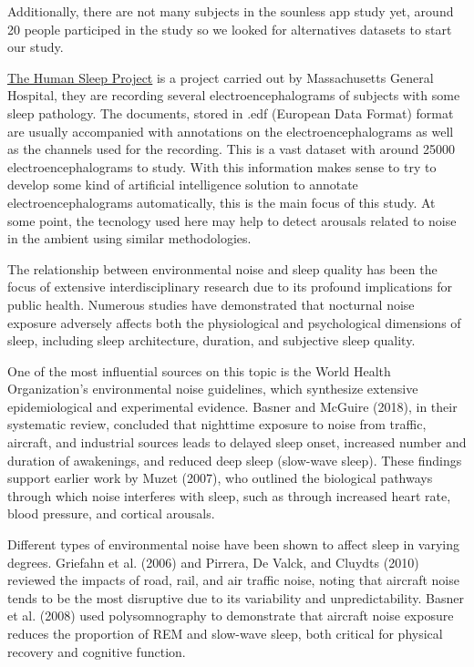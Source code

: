 Additionally, there are not many subjects in the sounless app study yet, around 20 people participed in the study so we looked for alternatives datasets to start our study.

\href{https://bdsp.io/content/hsp/2.0/}{The Human Sleep Project} is a project carried out by Massachusetts General Hospital, they are recording several electroencephalograms of subjects with some sleep pathology. The documents, stored in .edf (European Data Format) format are usually accompanied with annotations on the electroencephalograms as well as the channels used for the recording. This is a vast dataset with around 25000 electroencephalograms to study. With this information makes sense to try to develop some kind of artificial intelligence solution to annotate electroencephalograms automatically, this is the main focus of this study. At some point, the tecnology used here may help to detect arousals related to noise in the ambient using similar methodologies. 


The relationship between environmental noise and sleep quality has been the focus of extensive interdisciplinary research due to its profound implications for public health. Numerous studies have demonstrated that nocturnal noise exposure adversely affects both the physiological and psychological dimensions of sleep, including sleep architecture, duration, and subjective sleep quality.

One of the most influential sources on this topic is the World Health Organization's environmental noise guidelines, which synthesize extensive epidemiological and experimental evidence. Basner and McGuire (2018), in their systematic review, concluded that nighttime exposure to noise from traffic, aircraft, and industrial sources leads to delayed sleep onset, increased number and duration of awakenings, and reduced deep sleep (slow-wave sleep). These findings support earlier work by Muzet (2007), who outlined the biological pathways through which noise interferes with sleep, such as through increased heart rate, blood pressure, and cortical arousals.

Different types of environmental noise have been shown to affect sleep in varying degrees. Griefahn et al. (2006) and Pirrera, De Valck, and Cluydts (2010) reviewed the impacts of road, rail, and air traffic noise, noting that aircraft noise tends to be the most disruptive due to its variability and unpredictability. Basner et al. (2008) used polysomnography to demonstrate that aircraft noise exposure reduces the proportion of REM and slow-wave sleep, both critical for physical recovery and cognitive function.

